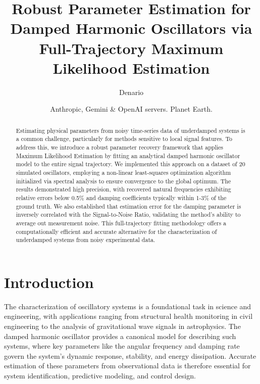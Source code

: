 \documentclass[]{article}
\begin{document}
\title{Robust Parameter Estimation for Damped Harmonic Oscillators via Full-Trajectory Maximum Likelihood Estimation}

\author{Denario}
\date{Anthropic, Gemini \& OpenAI servers. Planet Earth.}

\maketitle
\begin{abstract}
Estimating physical parameters from noisy time-series data of underdamped systems is a common challenge, particularly for methods sensitive to local signal features. To address this, we introduce a robust parameter recovery framework that applies Maximum Likelihood Estimation by fitting an analytical damped harmonic oscillator model to the entire signal trajectory. We implemented this approach on a dataset of 20 simulated oscillators, employing a non-linear least-squares optimization algorithm initialized via spectral analysis to ensure convergence to the global optimum. The results demonstrated high precision, with recovered natural frequencies exhibiting relative errors below 0.5\% and damping coefficients typically within 1-3\% of the ground truth. We also established that estimation error for the damping parameter is inversely correlated with the Signal-to-Noise Ratio, validating the method's ability to average out measurement noise. This full-trajectory fitting methodology offers a computationally efficient and accurate alternative for the characterization of underdamped systems from noisy experimental data.
\end{abstract}








\section{Introduction}
\label{sec:intro}
The characterization of oscillatory systems is a foundational task in science and engineering, with applications ranging from structural health monitoring in civil engineering to the analysis of gravitational wave signals in astrophysics. The damped harmonic oscillator provides a canonical model for describing such systems, where key parameters like the angular frequency and damping rate govern the system's dynamic response, stability, and energy dissipation. Accurate estimation of these parameters from observational data is therefore essential for system identification, predictive modeling, and control design.
\end{document}
